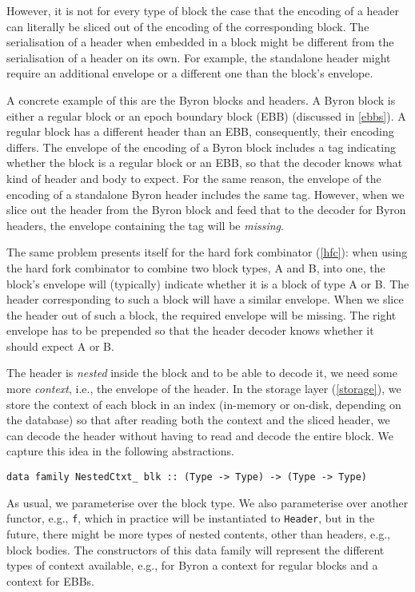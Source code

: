 However, it is not for every type of block the case that the encoding of a
header can literally be sliced out of the encoding of the corresponding block.
The serialisation of a header when embedded in a block might be different from
the serialisation of a header on its own. For example, the standalone header
might require an additional envelope or a different one than the block's
envelope.

A concrete example of this are the Byron blocks and headers. A Byron block is
either a regular block or an epoch boundary block (EBB) (discussed in
\cref{ebbs}). A regular block has a different header than an EBB, consequently,
their encoding differs. The envelope of the encoding of a Byron block includes a
tag indicating whether the block is a regular block or an EBB, so that the
decoder knows what kind of header and body to expect. For the same reason, the
envelope of the encoding of a standalone Byron header includes the same tag.
However, when we slice out the header from the Byron block and feed that to the
decoder for Byron headers, the envelope containing the tag will be
\emph{missing}.

The same problem presents itself for the hard fork combinator (\cref{hfc}): when
using the hard fork combinator to combine two block types, A and B, into one,
the block's envelope will (typically) indicate whether it is a block of type A
or B. The header corresponding to such a block will have a similar envelope.
When we slice the header out of such a block, the required envelope will be
missing. The right envelope has to be prepended so that the header decoder knows
whether it should expect A or B.

The header is \emph{nested} inside the block and to be able to decode it, we
need some more \emph{context}, i.e., the envelope of the header. In the storage
layer (\cref{storage}), we store the context of each block in an index
(in-memory or on-disk, depending on the database) so that after reading both the
context and the sliced header, we can decode the header without having to read
and decode the entire block. We capture this idea in the following abstractions.

\begin{lstlisting}
data family NestedCtxt_ blk :: (Type -> Type) -> (Type -> Type)
\end{lstlisting}
As usual, we parameterise over the block type. We also parameterise over another
functor, e.g., \lstinline!f!, which in practice will be instantiated to
\lstinline!Header!, but in the future, there might be more types of nested
contents, other than headers, e.g., block bodies. The constructors of this data
family will represent the different types of context available, e.g., for Byron
a context for regular blocks and a context for EBBs.

